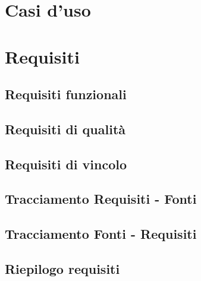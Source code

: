 %
%
%


\newpage
\section{Casi d'uso}

\newpage
\section{Requisiti}
\subsection{Requisiti funzionali}

\newpage
\subsection{Requisiti di qualità}

\newpage
\subsection{Requisiti di vincolo}

\newpage
\subsection{Tracciamento Requisiti - Fonti}

\newpage
\subsection{Tracciamento Fonti - Requisiti}

\newpage
\subsection{Riepilogo requisiti}

\newpage
